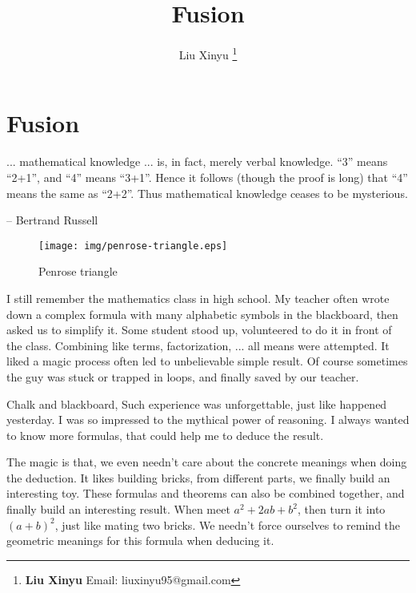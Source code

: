 \documentclass{article}
\begin{document}
\title{Fusion}

\author{Liu Xinyu
\thanks{{\bfseries Liu Xinyu} \newline
  Email: liuxinyu95@gmail.com \newline}
  }

\maketitle
\fi


\ifx\wholebook\relax
\chapter{Fusion}
\fi

\epigraph{... mathematical knowledge ... is, in fact, merely verbal knowledge. ``3'' means ``2+1'', and ``4'' means ``3+1''. Hence it follows (though the proof is long) that ``4'' means the same as ``2+2''. Thus mathematical knowledge ceases to be mysterious.}{-- Bertrand Russell}

\begin{wrapfigure}{R}{0.4\textwidth}
 \centering
 \texttt{[image: img/penrose-triangle.eps]}
 \captionsetup{labelformat=empty}
 \caption{Penrose triangle}
 \label{fig:Penrose-triangle}
\end{wrapfigure}

I still remember the mathematics class in high school. My teacher often wrote down a complex formula with many alphabetic symbols in the blackboard, then asked us to simplify it. Some student stood up, volunteered to do it in front of the class. Combining like terms, factorization, ... all means were attempted. It liked a magic process often led to unbelievable simple result. Of course sometimes the guy was stuck or trapped in loops, and finally saved by our teacher.

Chalk and blackboard, Such experience was unforgettable, just like happened yesterday. I was so impressed to the mythical power of reasoning. I always wanted to know more formulas, that could help me to deduce the result.

The magic is that, we even needn't care about the concrete meanings when doing the deduction. It likes building bricks, from different parts, we finally build an interesting toy. These formulas and theorems can also be combined together, and finally build an interesting result. When meet $a^2 + 2ab + b^2$, then turn it into $(a+b)^2$, just like mating two bricks. We needn't force ourselves to remind the geometric meanings for this formula when deducing it.
\end{document}
